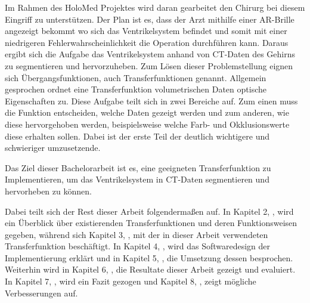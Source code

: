 Im Rahmen des HoloMed Projektes wird daran gearbeitet den Chirurg bei diesem Eingriff zu unterstützen. Der Plan ist es, dass der Arzt mithilfe einer AR-Brille angezeigt bekommt wo sich das Ventrikelsystem befindet und somit mit einer niedrigeren Fehlerwahrscheinlichkeit die Operation durchführen kann.
\newline
Daraus ergibt sich die Aufgabe das Ventrikelsystem anhand von CT-Daten des Gehirns zu segmentieren und hervorzuheben. Zum Lösen dieser Problemstellung eignen sich Übergangsfunktionen, auch Transferfunktionen genannt.
\newline
Allgemein gesprochen ordnet eine Transferfunktion volumetrischen Daten optische Eigenschaften zu. Diese Aufgabe teilt sich in zwei Bereiche auf. Zum einen muss die Funktion entscheiden, welche Daten gezeigt werden und zum anderen, wie diese hervorgehoben werden, beispielsweise welche Farb- und Okklusionswerte diese erhalten sollen. Dabei ist der erste Teil der deutlich wichtigere und schwieriger umzusetzende.


Das Ziel dieser Bachelorarbeit ist es, eine geeigneten Transferfunktion zu Implementieren, um das Ventrikelsystem in CT-Daten segmentieren und hervorheben zu können.


Dabei teilt sich der Rest dieser Arbeit folgendermaßen auf. In Kapitel 2, , wird ein Überblick über existierenden Transferfunktionen und deren Funktionsweisen gegeben, während sich Kapitel 3, , mit der in dieser Arbeit verwendeten Transferfunktion beschäftigt. In Kapitel 4, , wird das Softwaredesign der Implementierung erklärt und in Kapitel 5, , die Umsetzung dessen besprochen. Weiterhin wird in Kapitel 6, , die Resultate dieser Arbeit gezeigt und evaluiert. In Kapitel 7, , wird ein Fazit gezogen und Kapitel 8, , zeigt mögliche Verbesserungen auf.